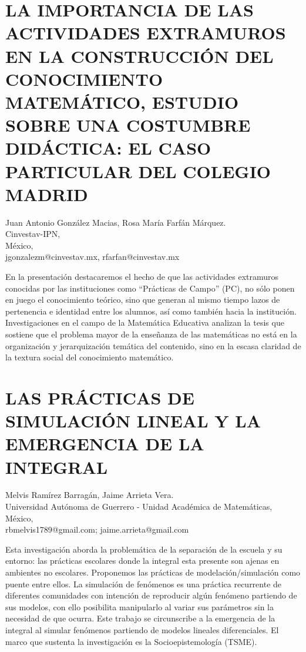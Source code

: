 \section{LA IMPORTANCIA DE LAS ACTIVIDADES EXTRAMUROS EN LA CONSTRUCCIÓN DEL
CONOCIMIENTO MATEMÁTICO, ESTUDIO SOBRE UNA COSTUMBRE DIDÁCTICA: EL
CASO PARTICULAR DEL COLEGIO MADRID }

\begin{datos}
Juan Antonio González Macias, Rosa María Farfán Márquez. \\
Cinvestav-IPN, \\
\hfill México, \\
\hfill jgonzalezm@cinvestav.mx, rfarfan@cinvestav.mx
\end{datos}

En la presentación destacaremos el hecho de que las actividades extramuros
conocidas por las instituciones como “Prácticas de Campo” (PC), no
sólo ponen en juego el conocimiento teórico, sino que generan al mismo
tiempo lazos de pertenencia e identidad entre los alumnos, así como
también hacia la institución. Investigaciones en el campo de la Matemática
Educativa analizan la tesis que sostiene que el problema mayor de
la enseñanza de las matemáticas no está en la organización y jerarquización
temática del contenido, sino en la escasa claridad de la textura social
del conocimiento matemático.


\section{\uppercase{ Las prácticas de simulación lineal y la emergencia de
la integral} }

\begin{datos}
Melvis Ramírez Barragán, Jaime Arrieta Vera. \\
Universidad Autónoma de Guerrero - Unidad Académica de Matemáticas, \\
\hfill México, \\
\hfill rbmelvis1789@gmail.com; jaime.arrieta@gmail.com
\end{datos}

Esta investigación aborda la problemática de la separación de la escuela
y su entorno: las prácticas escolares donde la integral esta presente
son ajenas en ambientes no escolares. Proponemos las prácticas de
modelación/simulación como puente entre ellos. La simulación de fenómenos
es una práctica recurrente de diferentes comunidades con intención
de reproducir algún fenómeno partiendo de sus modelos, con ello posibilita
manipularlo al variar sus parámetros sin la necesidad de que ocurra.
Este trabajo se circunscribe a la emergencia de la integral al simular
fenómenos partiendo de modelos lineales diferenciales. El marco que
sustenta la investigación es la Socioepistemología (TSME).


